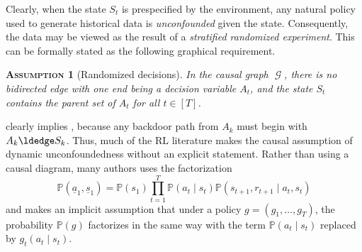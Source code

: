 \documentclass[12pt,a4paper]{article}
\newtheorem{assumption}{\normalfont\scshape Assumption}
\newtheorem{corollary}[theorem]{\normalfont\scshape Corollary}
\theoremstyle{definition}
\newcommand{\PP}[0]{\mathbb{P}}
\DeclareMathOperator{\gG}{\mathscr{G}}
\begin{document}
Clearly, when the state $S_t$ is prespecified by the environment, any
natural policy used to generate
historical data is \emph{unconfounded} given the state. Consequently,
the data may be viewed as the result of a \emph{stratified randomized
  experiment}. This can be formally stated as the following graphical
requirement.
\begin{assumption}[Randomized
  decisions]\label{assump:rl_behavior_policy}
  In the causal graph $\gG$, there is no bidirected edge with one end
  being a decision variable $A_t$, and the state $S_t$ contains the
  parent set of $A_t$ for all $t \in [T]$.
\end{assumption}

 clearly implies
, because any backdoor path from $A_k$
must begin with $A_k \ldedge S_k$. Thus, much of the RL literature
makes the causal assumption of dynamic unconfoundedness without
an explicit statement. Rather than using a causal diagram, many
authors uses the factorization
\[
  \PP(\underline{a}_1,\underline{s}_1) = \PP(s_1) \prod_{t=1}^T
  \PP(a_t \mid s_t) \PP(s_{t+1}, r_{t+1} \mid a_t, s_t)
\]
and makes an implicit assumption that under a policy $g = (g_1,\dots,
g_T)$, the probability $\PP(g)$ factorizes in the same way with the term
$\PP(a_t \mid s_t)$ replaced by $g_t(a_t \mid s_t)$.

\end{document}
